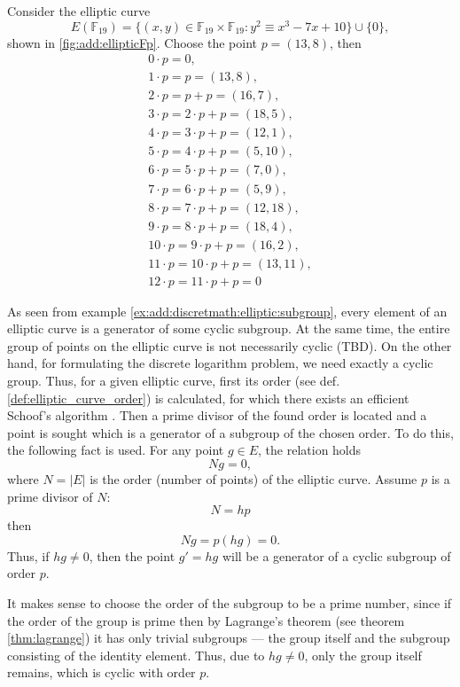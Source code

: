 \begin{example}
Consider the elliptic curve 
\[
E\left(\mathbb{F}_{19}\right) = 
\{(x,y) \in \mathbb{F}_{19} \times \mathbb{F}_{19}: y^2 \equiv x^3 -7 x +
10 \} \cup \{0\}, 
\] 
shown in \autoref{fig:add:ellipticFp}. Choose the point $p = (13, 8)$, then
\begin{eqnarray}
0 \cdot p = 0, \nonumber \\
1 \cdot p = p = (13,8), \nonumber \\
2 \cdot p = p + p = (16,7), \nonumber \\
3 \cdot p = 2 \cdot p + p = (18,5), \nonumber \\
4 \cdot p = 3 \cdot p + p = (12,1), \nonumber \\
5 \cdot p = 4 \cdot p + p = (5,10), \nonumber \\
6 \cdot p = 5 \cdot p +p = (7,0), \nonumber \\
7 \cdot p = 6 \cdot p + p = (5,9), \nonumber \\
8 \cdot p = 7 \cdot p +p = (12,18), \nonumber \\
9 \cdot p = 8 \cdot p + p = (18,4), \nonumber \\
10 \cdot p = 9 \cdot p + p = (16,2), \nonumber \\
11 \cdot p = 10 \cdot p + p = (13,11), \nonumber \\
12 \cdot p = 11 \cdot p + p = 0
\nonumber 
\end{eqnarray}
\label{ex:add:discretmath:elliptic:subgroup}
\end{example}
As seen from example \ref{ex:add:discretmath:elliptic:subgroup}, every element of an elliptic curve is a generator of some cyclic subgroup. At the same time, the entire group of points on the elliptic curve is not necessarily cyclic 
(TBD).
On the other hand, for formulating the discrete logarithm problem, we need exactly a cyclic group. Thus, for a given elliptic curve, first its order (see def. \ref{def:elliptic_curve_order}) is calculated, for which there exists an efficient Schoof's algorithm \cite{ReneSchoof:1985}. Then a prime divisor of the found order is located and a point is sought which is a generator of a subgroup of the chosen order. To do this, the following fact is used. For any point 
$g \in E$, the relation holds
\[
N g = 0,
\]
where $N = \left|E\right|$ is the order (number of points) of the elliptic curve.
Assume $p$ is a prime divisor of $N$:
\[
N = h p
\]
then
\[
N g = p \left( h g \right) = 0.
\]
Thus, if $hg \ne 0$, then the point $g' = h g$ will be a generator of a cyclic subgroup of order $p$.
\begin{remark}
It makes sense to choose the order of the subgroup to be a prime number, since if the order of the group is prime then by Lagrange's theorem (see theorem \ref{thm:lagrange})  it has only trivial subgroups — the group itself and the subgroup consisting of the identity element. Thus, due to $hg \ne 0$, only the group itself remains, which is cyclic with order $p$. 
\end{remark}

